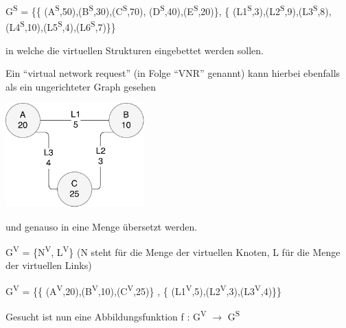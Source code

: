 \documentclass{lni}
\begin{document}
\begin{center}
G\textsuperscript{S} = 
\{\{
(A\textsuperscript{S},50),(B\textsuperscript{S},30),(C\textsuperscript{S},70),
(D\textsuperscript{S},40),(E\textsuperscript{S},20)\},
\newline\{
(L1\textsuperscript{S},3),(L2\textsuperscript{S},9),(L3\textsuperscript{S},8),
(L4\textsuperscript{S},10),(L5\textsuperscript{S},4),(L6\textsuperscript{S},7)\}\}
\end{center}
in welche die virtuellen Strukturen eingebettet werden sollen.

Ein "`virtual network request"' (in Folge "`VNR"' genannt) kann hierbei ebenfalls als ein ungerichteter Graph gesehen
\begin{center}
	\includegraphics[width=0.4\textwidth]{VNR1.pdf}\newline
\end{center}
und genauso in eine Menge übersetzt werden.\newline
\begin{center}
G\textsuperscript{V} = \{N\textsuperscript{V}, L\textsuperscript{V}\}\newline
(N steht für die Menge der virtuellen Knoten, L für die Menge der virtuellen Links)
\end{center}

\begin{center}
G\textsuperscript{V} = \{\{
(A\textsuperscript{V},20),(B\textsuperscript{V},10),(C\textsuperscript{V},25)\} , \{
(L1\textsuperscript{V},5),(L2\textsuperscript{V},3),(L3\textsuperscript{V},4)\}\}
\end{center}

\begin{center}
Gesucht ist nun eine Abbildungsfunktion f : G\textsuperscript{V} $\rightarrow$ G\textsuperscript{S}
\end{center}
\end{document}

